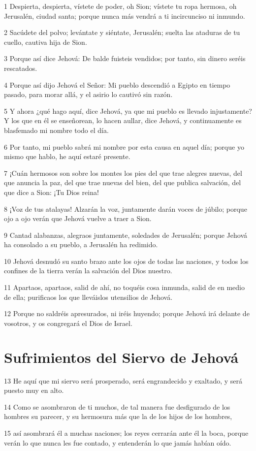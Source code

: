 \par 1 Despierta, despierta, vístete de poder, oh Sion; vístete tu ropa hermosa, oh Jerusalén, ciudad santa; porque nunca más vendrá a ti incircunciso ni inmundo.
\par 2 Sacúdete del polvo; levántate y siéntate, Jerusalén; suelta las ataduras de tu cuello, cautiva hija de Sion.
\par 3 Porque así dice Jehová: De balde fuisteis vendidos; por tanto, sin dinero seréis rescatados.
\par 4 Porque así dijo Jehová el Señor: Mi pueblo descendió a Egipto en tiempo pasado, para morar allá, y el asirio lo cautivó sin razón.
\par 5 Y ahora ¿qué hago aquí, dice Jehová, ya que mi pueblo es llevado injustamente? Y los que en él se enseñorean, lo hacen aullar, dice Jehová, y continuamente es blasfemado mi nombre todo el día.
\par 6 Por tanto, mi pueblo sabrá mi nombre por esta causa en aquel día; porque yo mismo que hablo, he aquí estaré presente.
\par 7 ¡Cuán hermosos son sobre los montes los pies del que trae alegres nuevas, del que anuncia la paz, del que trae nuevas del bien, del que publica salvación, del que dice a Sion: ¡Tu Dios reina!
\par 8 ¡Voz de tus atalayas! Alzarán la voz, juntamente darán voces de júbilo; porque ojo a ojo verán que Jehová vuelve a traer a Sion.
\par 9 Cantad alabanzas, alegraos juntamente, soledades de Jerusalén; porque Jehová ha consolado a su pueblo, a Jerusalén ha redimido.
\par 10 Jehová desnudó su santo brazo ante los ojos de todas las naciones, y todos los confines de la tierra verán la salvación del Dios nuestro.
\par 11 Apartaos, apartaos, salid de ahí, no toquéis cosa inmunda, salid de en medio de ella; purificaos los que lleváislos utensilios de Jehová.
\par 12 Porque no saldréis apresurados, ni iréis huyendo; porque Jehová irá delante de vosotros, y os congregará el Dios de Israel.

\section*{Sufrimientos del Siervo de Jehová}

\par 13 He aquí que mi siervo será prosperado, será engrandecido y exaltado, y será puesto muy en alto.
\par 14 Como se asombraron de ti muchos, de tal manera fue desfigurado de los hombres su parecer, y su hermosura más que la de los hijos de los hombres,
\par 15 así asombrará él a muchas naciones; los reyes cerrarán ante él la boca, porque verán lo que nunca les fue contado, y entenderán lo que jamás habían oído. 

